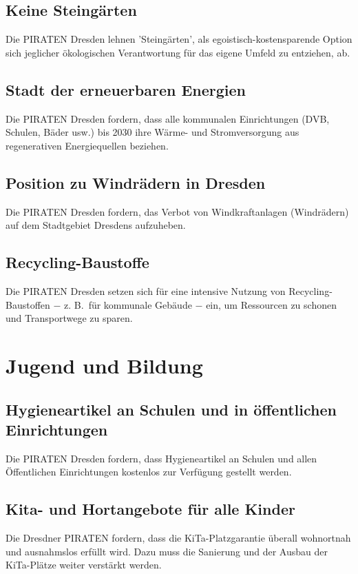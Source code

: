 \documentclass[a4paper, 11pt]{article}
\begin{document}
\subsection{Keine Steingärten}
Die PIRATEN Dresden lehnen 'Steingärten', als egoistisch-kostensparende Option sich jeglicher ökologischen Verantwortung für das eigene Umfeld zu entziehen, ab.


\subsection{Stadt der erneuerbaren Energien}
Die PIRATEN Dresden fordern, dass alle kommunalen Einrichtungen (DVB, Schulen, Bäder usw.) bis 2030 ihre Wärme- und Stromversorgung aus regenerativen Energiequellen beziehen.


\subsection{Position zu Windrädern in Dresden}
Die PIRATEN Dresden fordern, das Verbot von Windkraftanlagen (Windrädern) auf dem Stadtgebiet Dresdens aufzuheben.


\subsection{Recycling-Baustoffe}
Die PIRATEN Dresden setzen sich für eine intensive Nutzung von Recycling-Baustoffen $-$ z. B.~für kommunale Gebäude $-$ ein, um Ressourcen zu schonen und Transportwege zu sparen.


\section{Jugend und Bildung}

\subsection{Hygieneartikel an Schulen und in öffentlichen Einrichtungen}
Die PIRATEN Dresden fordern, dass Hygieneartikel an Schulen und allen Öffentlichen Einrichtungen kostenlos zur Verfügung gestellt werden.


\subsection{Kita- und Hortangebote für alle Kinder}
Die Dresdner PIRATEN fordern, dass die KiTa-Platzgarantie überall wohnortnah und ausnahmslos erfüllt wird. Dazu muss die Sanierung und der Ausbau der KiTa-Plätze weiter verstärkt werden.
\end{document}
